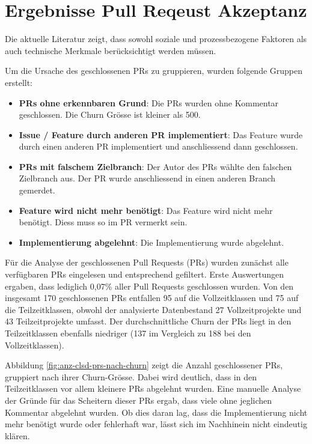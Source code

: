\section{Ergebnisse Pull Reqeust Akzeptanz}
Die aktuelle Literatur zeigt, dass sowohl soziale und prozessbezogene Faktoren als auch technische Merkmale berücksichtigt werden müssen. 

Um die Ursache des geschlossenen PRs zu gruppieren, wurden folgende Gruppen erstellt: 
\begin{itemize}
    \item \textbf{PRs ohne erkennbaren Grund}: Die PRs wurden ohne Kommentar geschlossen. Die Churn Grösse ist kleiner als 500. 
    \item \textbf{Issue / Feature durch anderen PR implementiert}: Das Feature wurde durch einen anderen PR implementiert und anschliessend dann geschlossen. 
    \item \textbf{PRs mit falschem Zielbranch}: Der Autor des PRs wählte den falschen Zielbranch aus. Der PR wurde anschliessend in einen anderen Branch gemerdet. 
    \item \textbf{Feature wird nicht mehr benötigt}: Das Feature wird nicht mehr benötigt. Diess muss so im PR vermerkt sein. 
    \item \textbf{Implementierung abgelehnt}: Die Implementierung wurde abgelehnt. 
\end{itemize}


Für die Analyse der geschlossenen Pull Requests (PRs) wurden zunächst alle verfügbaren PRs eingelesen und entsprechend gefiltert. Erste Auswertungen ergaben, dass lediglich 0,07\% aller Pull Requests geschlossen wurden. Von den insgesamt 170 geschlossenen PRs entfallen 95 auf die Vollzeitklassen und 75 auf die Teilzeitklassen, obwohl der analysierte Datenbestand 27 Vollzeitprojekte und 43 Teilzeitprojekte umfasst. Der durchschnittliche Churn der PRs liegt in den Teilzeitklassen ebenfalls niedriger (137 im Vergleich zu 188 bei den Vollzeitklassen).

Abbildung \autoref{fig:anz-clsd-prs-nach-churn} zeigt die Anzahl geschlossener PRs, gruppiert nach ihrer Churn-Grösse. Dabei wird deutlich, dass in den Teilzeitklassen vor allem kleinere PRs abgelehnt wurden. Eine manuelle Analyse der Gründe für das Scheitern dieser PRs ergab, dass viele ohne jeglichen Kommentar abgelehnt wurden. Ob dies daran lag, dass die Implementierung nicht mehr benötigt wurde oder fehlerhaft war, lässt sich im Nachhinein nicht eindeutig klären.

